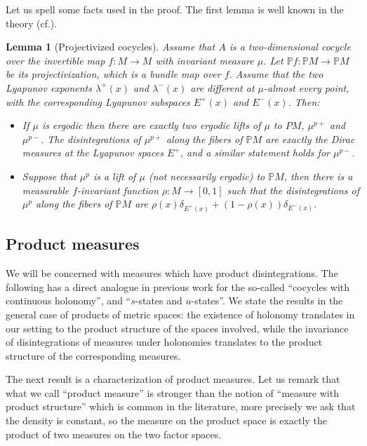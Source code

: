 \documentclass[11pt,letterpaper,reqno]{article}
\newtheorem{lemma}{Lemma}[section]
\newcommand{\Pp}{\mathbb P}
\begin{document}
Let us spell some facts used in the proof. The first lemma is well known in the theory (cf.\@ \cite{LyaViana}).


\begin{lemma}[Projectivized cocycles]\label{le:projective}
Assume that $A$ is a two-dimensional cocycle over the invertible map $f:M\rightarrow M$ with invariant measure $\mu$. Let $\Pp f:\Pp M\rightarrow \Pp M$ be its projectivization, which is a bundle map over $f$. Assume that the two Lyapunov exponents $\lambda^+(x)$ and $\lambda^-(x)$ are different at $\mu$-almost every point, with the corresponding Lyapunov subspaces $E^+(x)$ and $E^-(x)$. Then:
\begin{itemize}
\item
If $\mu$ is ergodic then there are exactly two ergodic lifts of $\mu$ to $PM$, $\mu^{p+}$ and $\mu^{p-}$. The disintegrations of $\mu^{p+}$ along the fibers of $\Pp M$ are exactly the Dirac measures at the Lyapunov spaces $E^+$, and a similar statement holds for $\mu^{p-}$.
\item
Suppose that $\mu^p$ is a lift of $\mu$ (not necessarily ergodic) to $\Pp M$, then there is a measurable $f$-invariant function $\rho:M\rightarrow[0,1]$ such that the disintegrations of $\mu^p$ along the fibers of $\Pp M$ are $\rho(x)\delta_{E^+(x)}+(1-\rho(x))\delta_{E^-(x)}$.
\end{itemize}
\end{lemma}

\subsection{Product measures} We will be concerned with measures which have product disintegrations. The following has a direct analogue in previous work for the so-called ``cocycles with continuous holonomy'', and ``$s$-states and $u$-states''. We state the results in the general case of products of metric spaces: \color{black} the existence of holonomy translates in our setting to the product structure of the spaces involved, while the invariance of disintegrations of measures under holonomies translates to the product structure of the corresponding measures.


The next result is a characterization of product measures. Let us remark that what we call ``product measure'' is stronger than the notion of ``measure with product structure'' which is common in the literature, more precisely we ask that the density is constant, so the measure on the product space is exactly the product of two measures on the two factor spaces. \color{black}
\end{document}
